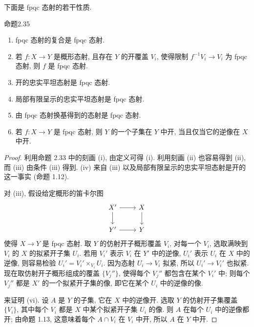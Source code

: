 下面是 fpqc 态射的若干性质.

\begin{origstatement}{命题}{2.35}\label{ch02:prop235}
\begin{enumerate}
\item[(i)] fpqc 态射的复合是 fpqc 态射.
\item[(ii)] 若 $f:X\to Y$ 是概形态射, 且存在 $Y$ 的开覆盖 $V_i$, 使得限制 $f^{-1}V_i\to V_i$ 为 fpqc 态射, 则 $f$ 是 fpqc 态射.
\item[(iii)] 开的忠实平坦态射是 fpqc 态射.
\item[(iv)] 局部有限呈示的忠实平坦态射是 fpqc 态射.
\item[(v)] 由 fpqc 态射换基得到的态射是 fpqc 态射.
\item[(vi)] 若 $f:X\to Y$ 是 fpqc 态射, 则 $Y$ 的一个子集在 $Y$ 中开, 当且仅当它的逆像在 $X$ 中开.
\end{enumerate}
\end{origstatement}
\begin{proof}
利用命题 2.33 中的刻画 (i), 由定义可得 (i). 利用刻画 (ii) 也容易得到 (ii), 而 (iii) 由条件 (iii) 得到. (iv) 来自 (iii) 以及局部有限呈示的忠实平坦态射是开的这一事实 (命题 1.12).

对 (iii), 假设给定概形的笛卡尔图
\[
\begin{tikzcd}X'\arrow[r]\arrow[d]&X\arrow[d]\\Y'\arrow[r]&Y\end{tikzcd}
\]
使得 $X\to Y$ 是 fpqc 态射. 取 $Y$ 的仿射开子概形覆盖 $V_i$, 对每一个 $V_i$, 选取满映到 $V_i$ 的 $X$ 的拟紧开子集 $U_i$. 若用 $V_i'$ 表示 $V_i$ 在 $Y'$ 中的逆像, $U_i'$ 表示 $U_i$ 在 $X$ 中的逆像, 则容易检验 $U_i'=V_i'\times_{V_i}U_i$. 因为态射 $U_i\to V_i$ 拟紧, 所以 $U_i'\to V_i'$ 也拟紧. 现在取仿射开子概形组成的覆盖 $\{V_j''\}$, 使得每个 $V_j''$ 都包含在某个 $V_i'$ 中; 则每个 $V_j''$ 都是 $X'$ 的一个拟紧开子集的像, 即它在某个 $U_i$ 中的逆像的像.

来证明 (vi). 设 $A$ 是 $Y$ 的子集, 它在 $X$ 中的逆像开. 选取 $Y$ 的仿射开子集覆盖 $\{V_i\}$, 其中每个 $V_i$ 都是 $X$ 中某个拟紧开子集 $U_i$ 的像. 则 $A$ 在每个 $U_i$ 中的逆像都开; 由命题 1.13, 这意味着每个 $A\cap V_i$ 在 $V_i$ 中开, 所以 $A$ 在 $Y$ 中开.
\end{proof}

